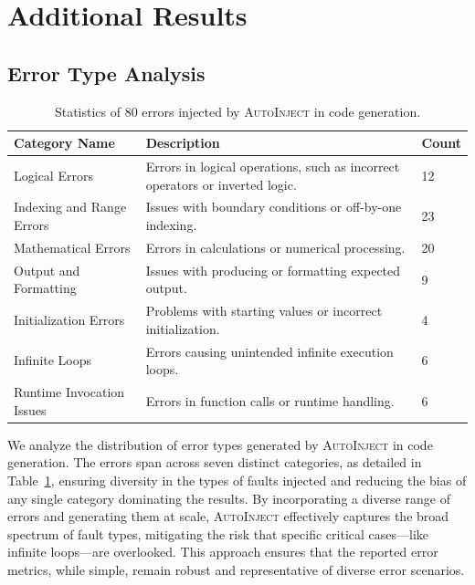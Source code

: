 \documentclass{article}
\theoremstyle{plain}
\theoremstyle{definition}
\theoremstyle{remark}
\begin{document}
\clearpage

\section{Additional Results}

\subsection{Error Type Analysis}

\begin{table}[h!]
    \centering
    \begin{tabular}{lll}
        \toprule
        \bf Category Name & \bf Description & \bf Count \\
        \midrule
        Logical Errors & Errors in logical operations, such as incorrect operators or inverted logic. & 12 \\
        Indexing and Range Errors & Issues with boundary conditions or off-by-one indexing. & 23 \\
        Mathematical Errors & Errors in calculations or numerical processing. & 20 \\
        Output and Formatting & Issues with producing or formatting expected output. & 9 \\
        Initialization Errors & Problems with starting values or incorrect initialization. & 4 \\
        Infinite Loops & Errors causing unintended infinite execution loops. & 6 \\
        Runtime Invocation Issues & Errors in function calls or runtime handling. & 6 \\
        \bottomrule
    \end{tabular}
    \caption{Statistics of 80 errors injected by \textsc{AutoInject} in code generation.}
    \label{tab:error-statistics}
\end{table}

We analyze the distribution of error types generated by \textsc{AutoInject} in code generation.
The errors span across seven distinct categories, as detailed in Table~\ref{tab:error-statistics}, ensuring diversity in the types of faults injected and reducing the bias of any single category dominating the results.
By incorporating a diverse range of errors and generating them at scale, \textsc{AutoInject} effectively captures the broad spectrum of fault types, mitigating the risk that specific critical cases—like infinite loops—are overlooked.
This approach ensures that the reported error metrics, while simple, remain robust and representative of diverse error scenarios.
\end{document}
